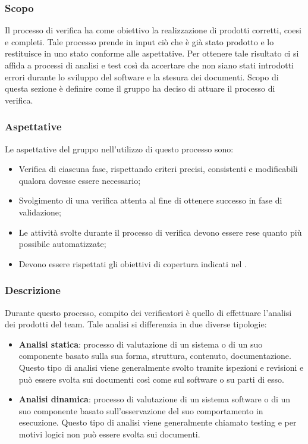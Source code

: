     \subsubsection{Scopo}
    Il processo di verifica ha come obiettivo la realizzazione di prodotti corretti, coesi e completi. Tale processo prende in input ciò che è già stato prodotto e lo restituisce in uno stato conforme alle aspettative. Per ottenere tale risultato ci si affida a processi di analisi e test così da accertare che non siano stati introdotti errori durante lo sviluppo del software e la stesura dei documenti. Scopo di questa sezione è definire come il gruppo ha deciso di attuare il processo di verifica.

    \subsubsection{Aspettative}
    Le aspettative del gruppo \groupName{} nell'utilizzo di questo processo sono:
    \begin{itemize}
        \item Verifica di ciascuna fase, rispettando criteri precisi, consistenti e modificabili qualora dovesse essere necessario;
        \item Svolgimento di una verifica attenta al fine di ottenere successo in fase di validazione;
        \item Le attività svolte durante il processo di verifica devono essere rese quanto più possibile automatizzate;
        \item Devono essere rispettati gli obiettivi di copertura indicati nel \docNamePdQLow{}.
    \end{itemize}

    \subsubsection{Descrizione}
    Durante questo processo, compito dei verificatori è quello di effettuare l'analisi dei prodotti del team. Tale analisi si differenzia in due diverse tipologie:
    \begin{itemize}
        \item \textbf{Analisi statica}: processo di valutazione di un sistema o di un suo componente basato sulla sua forma, struttura, contenuto, documentazione. Questo tipo di analisi viene generalmente svolto tramite ispezioni e revisioni e può essere svolta sui documenti così come sul software o su parti di esso.
        \item \textbf{Analisi dinamica}: processo di valutazione di un sistema software o di un suo componente basato sull'osservazione del suo comportamento in esecuzione. Questo tipo di analisi viene generalmente chiamato testing e per motivi logici non può essere svolta sui documenti.
    \end{itemize}


